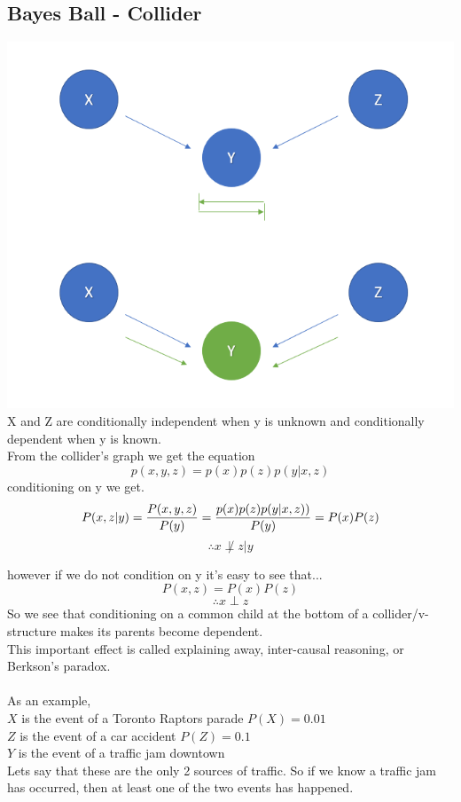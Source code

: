 \documentclass{article}
\begin{document}
\subsection{Bayes Ball - Collider}
\includegraphics[scale=0.7]{Screenshot_9.png}\\
X and Z are conditionally independent when y is unknown and conditionally dependent when y is known.\\
From the collider's graph we get the equation\\
$$p(x, y, z) = p(x)p(z)p(y|x, z)$$
conditioning on y we get.
$$
P(x, z | y) = \frac{P(x, y, z)}{P(y)} \\
= \frac{p(x)p(z)p(y|x, z))}{P(y)} \\
= P(x) P(z) \\ 
$$
$$\therefore  x \not \perp z | y$$

however if we do not condition on y it's  easy to see that...
$$ P(x, z) = P(x) P(z)$$
$$\therefore  x \perp z$$
So we see that conditioning on a common child at the bottom of a collider/v-structure makes its parents become dependent.\\
This important effect is called explaining away, inter-causal reasoning, or Berkson’s paradox.\\
\\
As an example,\\
$X$ is the event of a Toronto Raptors parade $P(X)=0.01$\\
$Z$ is the event of a car accident $P(Z)=0.1$\\
$Y$ is the event of a traffic jam downtown\\
Lets say that these are the only 2 sources of traffic. So if we know a traffic jam has occurred, then at least one of the two events has happened.\\
\end{document}
